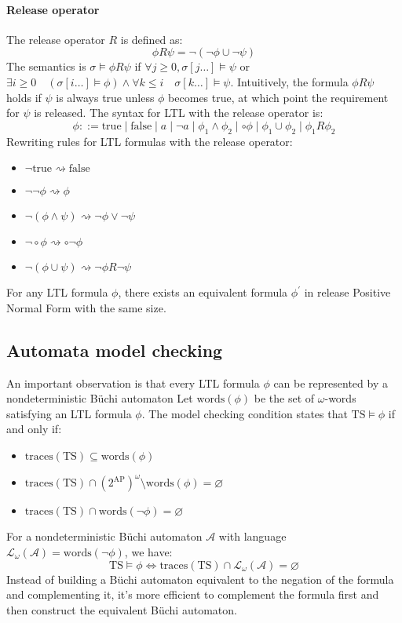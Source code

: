 \paragraph*{Release operator}
The release operator $R$ is defined as: 
\[\phi R \psi =\lnot(\lnot\phi\cup\lnot\psi)\]
\noindent The semantics is $\sigma\models\phi R \psi$ if $\forall j \geq 0, \sigma[j\dots]\models\psi$ or $\exists i \geq 0 \quad (\sigma[i\dots]\models\phi)\land \forall k \leq i \quad \sigma[k\dots]\models\psi$.
Intuitively, the formula $\phi R \psi$ holds if $\psi$ is always true unless $\phi$ becomes true, at which point the requirement for $\psi$ is released. 
The syntax for LTL with the release operator is:
\[\phi::=\text{true}\mid\text{false}\mid a \mid\lnot a\mid \phi_1\land\phi_2\mid\circ\phi\mid\phi_1\cup\phi_2\mid\phi_1 R \phi_2\]
\noindent Rewriting rules for LTL formulas with the release operator:
\begin{itemize}
    \item $\lnot\text{true}\rightsquigarrow \text{false}$
    \item $\lnot\lnot\phi\rightsquigarrow \phi$
    \item $\lnot(\phi\land\psi)\rightsquigarrow\lnot\phi\lor\lnot\psi$
    \item $\lnot\circ\phi\rightsquigarrow\circ\lnot\phi$
    \item $\lnot(\phi\cup\psi)\rightsquigarrow\lnot\phi R \lnot\psi$
\end{itemize}
\noindent For any LTL formula $\phi$, there exists an equivalent formula $\phi^\prime$ in release Positive Normal Form with the same size.

\subsection{Automata model checking}
An important observation is that every LTL formula $\phi$ can be represented by a nondeterministic Büchi automaton
Let $\text{words}(\phi)$ be the set of $\omega$-words satisfying an LTL formula $\phi$. 
The model checking condition states that $\text{TS}\models\phi$ if and only if: 
\begin{itemize}
    \item $\text{traces}(\text{TS}) \subseteq \text{words}(\phi)$
    \item $\text{traces}(\text{TS}) \cap \left( 2^{\text{AP}} \right)^{\omega} \setminus \text{words}(\phi) = \varnothing$
    \item $\text{traces}(\text{TS}) \cap \text{words}(\lnot \phi) = \varnothing$
\end{itemize}
\noindent For a nondeterministic Büchi automaton $\mathcal{A}$ with language $\mathcal{L}_{\omega}(\mathcal{A})=\text{words}(\lnot\phi)$, we have:
\[\text{TS}\models\phi\Leftrightarrow\text{traces}(\text{TS})\cap\mathcal{L}_{\omega}(\mathcal{A})=\varnothing\]
Instead of building a Büchi automaton equivalent to the negation of the formula and complementing it, it's more efficient to complement the formula first and then construct the equivalent Büchi automaton.

